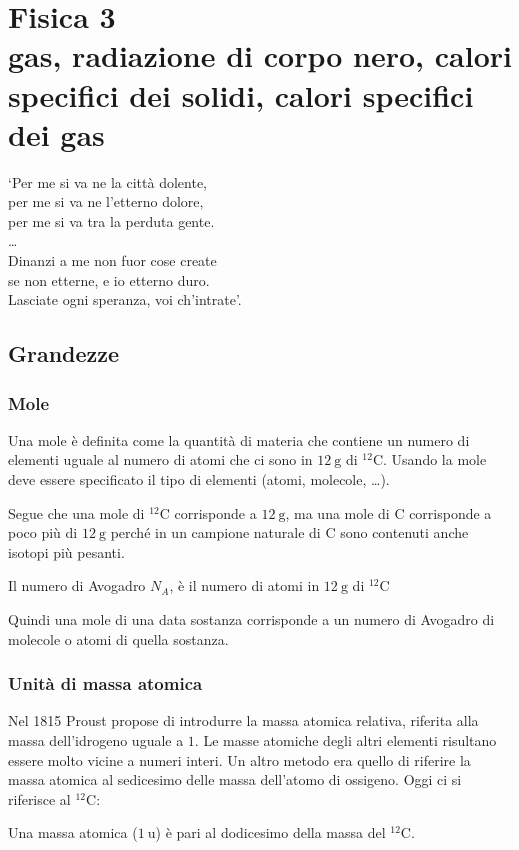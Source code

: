 \part[Fisica 3]{Fisica 3\\\vspace{1cm}\large{gas, radiazione di corpo nero, calori specifici dei solidi, calori specifici dei gas}}
\begin{savequote}[6cm]
	`Per me si va ne la città dolente,\\ per me si va ne l'etterno dolore,\\ per me si va tra la perduta gente.\\
	\ldots\\
	Dinanzi a me non fuor cose create\\ se non etterne, e io etterno duro.\\ Lasciate ogni speranza, voi ch'intrate'.
\end{savequote}
\chapter{Grandezze}
\minitoc
\section{Mole}
\begin{Def}[mole]
	Una mole è definita come la quantità di materia che contiene un numero di elementi uguale al numero di atomi che ci sono in $\SI{12}{\gram}$ di $^{12}\mathrm{C}$. Usando la mole deve essere specificato il tipo di elementi (atomi, molecole, \ldots).
\end{Def}
Segue che una mole di $^{12}\mathrm{C}$ corrisponde a $\SI{12}{\gram}$, ma una mole di $\mathrm{C}$ corrisponde a poco più di $\SI{12}{\gram}$ perché in un campione naturale di $\mathrm{C}$ sono contenuti anche isotopi più pesanti.
\begin{Def}
	Il numero di Avogadro $N_A$, è il numero di atomi in $\SI{12}{\gram}$ di $^{12}\mathrm{C}$
\end{Def}
Quindi una mole di una data sostanza corrisponde a un numero di Avogadro di molecole o atomi di quella sostanza.
\section{Unità di massa atomica}
Nel 1815 Proust propose di introdurre la massa atomica relativa, riferita alla massa dell'idrogeno uguale a $1$. Le masse atomiche degli altri elementi risultano essere molto vicine a numeri interi. Un altro metodo era quello di riferire la massa atomica al sedicesimo delle massa dell'atomo di ossigeno. Oggi ci si riferisce al $^{12}\mathrm{C}$:
\begin{Def}
	Una massa atomica ($\SI{1}{\atomicmassunit}$) è pari al dodicesimo della massa del $^{12}\mathrm{C}$.
\end{Def}


